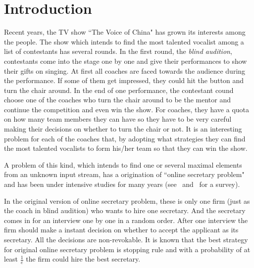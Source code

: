 \chapter{Introduction}

Recent years, the TV show ``The Voice of China" has grown its interests
among the people. The show which intends to find the most talented vocalist
among a list of contestants has several rounds. In the first round,
the \emph{blind audition}, contestants come into the stage one by one
and give their performances to show their gifts on singing. 
At first all coaches are faced towards the audience during the performance.
If some of them get impressed, they could hit the button and turn the chair
around. In the end of one performance, the contestant cound choose one of
the coaches who turn the chair around to be the mentor and continue the
competition and even win the show. For coaches, they have a quota on
how many team members they can have so they have to be very careful 
making their decisions on whether to turn the chair or not.
It is an interesting problem for each of the coaches that, by adopting
what strategies they can find the most talented vocalists to form his/her
team so that they can win the show.

A problem of this kind, which intends to find one or several maximal
elements from an unknown input stream, has a origination of
``online secretary problem" and has been under intensive studies for many
years (see~\cite{ferguson1989solved} and~\cite{freeman1983secretary} for a
survey).

In the original version of online secretary problem, these is only one
firm (just as the coach in blind audition) who wants to hire one secretary.
And the secretary comes in for an interview one by one in a random order.
After one interview the firm should make a instant decision on whether to
accept the applicant as its secretary. All the decisions are non-revokable.
It is known that the best strategy for original online secretary problem
is stopping rule and with a probability of at least $\frac{1}{e}$ the firm
could hire the best secretary.

